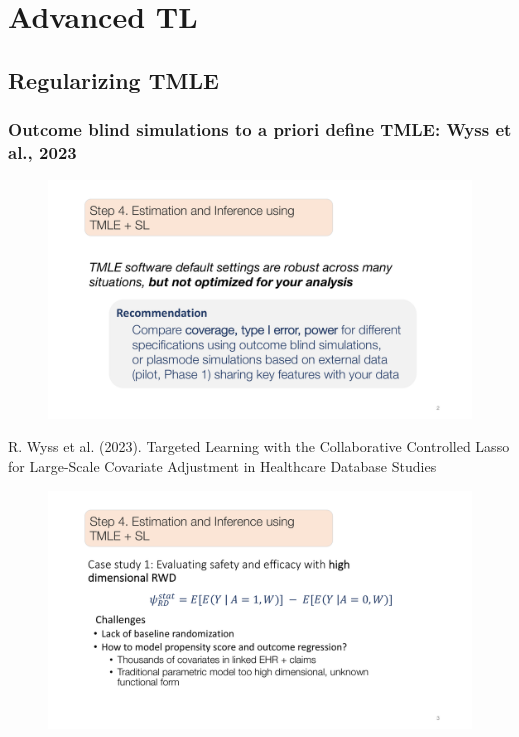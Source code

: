 \documentclass[t]{beamer}
\begin{document}
\section{Advanced TL}

\subsection{Regularizing TMLE}

\begin{frame}\frametitle{Outcome blind simulations to a priori define TMLE: Wyss
et al., 2023}

\centering
\begin{figure}
\begin{center}
\includegraphics[width=1.02\textwidth]{figures/abbviepdfslides_2.pdf}
\end{center}
\end{figure}
{\small R. Wyss et al. (2023). Targeted Learning with the Collaborative
Controlled Lasso for Large-Scale Covariate Adjustment in Healthcare Database
Studies}
\end{frame}

\begin{frame}
\centering
\begin{figure}
\begin{center}
\includegraphics[width=1.02\textwidth]{figures/abbviepdfslides_3.pdf}
\end{center}
\end{figure}
\end{frame}
\end{document}

